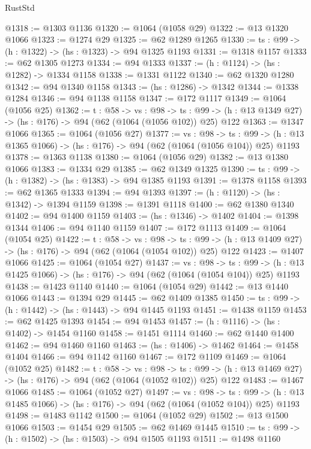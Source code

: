 \begin{lexlean}{RustStd}
\begin{coremodule}
{\begin{coremodule}
{{{{{{{{{{{@1318 := @1303 @1136
@1320 := @1064 (@1058 @29)
@1322 := @13 @1320 @1066
@1323 := @1274 @29
@1325 := @62 @1289 @1265
@1330 := {ts : @99} -> (h : @1322) -> (hs : @1323) -> @94 @1325 @1193
@1331 := @1318 @1157
@1333 := @62 @1305 @1273
@1334 := @94 @1333
@1337 := (h : @1124) -> (hs : @1282) -> @1334 @1158
@1338 := @1331 @1122
@1340 := @62 @1320 @1280
@1342 := @94 @1340 @1158
@1343 := (hs : @1286) -> @1342
@1344 := @1338 @1284
@1346 := @94 @1138 @1158
@1347 := @172 @1117
@1349 := @1064 (@1056 @25)
@1362 := {t : @58} ->
  {vs : @98} ->
  {ts : @99} -> (h : @13 @1349 @27) -> (hs : @176) -> @94 (@62 (@1064 (@1056 @102)) @25) @122
@1363 := @1347 @1066
@1365 := @1064 (@1056 @27)
@1377 := {vs : @98} ->
  {ts : @99} -> (h : @13 @1365 @1066) -> (hs : @176) -> @94 (@62 (@1064 (@1056 @104)) @25) @1193
@1378 := @1363 @1138
@1380 := @1064 (@1056 @29)
@1382 := @13 @1380 @1066
@1383 := @1334 @29
@1385 := @62 @1349 @1325
@1390 := {ts : @99} -> (h : @1382) -> (hs : @1383) -> @94 @1385 @1193
@1391 := @1378 @1158
@1393 := @62 @1365 @1333
@1394 := @94 @1393
@1397 := (h : @1120) -> (hs : @1342) -> @1394 @1159
@1398 := @1391 @1118
@1400 := @62 @1380 @1340
@1402 := @94 @1400 @1159
@1403 := (hs : @1346) -> @1402
@1404 := @1398 @1344
@1406 := @94 @1140 @1159
@1407 := @172 @1113
@1409 := @1064 (@1054 @25)
@1422 := {t : @58} ->
  {vs : @98} ->
  {ts : @99} -> (h : @13 @1409 @27) -> (hs : @176) -> @94 (@62 (@1064 (@1054 @102)) @25) @122
@1423 := @1407 @1066
@1425 := @1064 (@1054 @27)
@1437 := {vs : @98} ->
  {ts : @99} -> (h : @13 @1425 @1066) -> (hs : @176) -> @94 (@62 (@1064 (@1054 @104)) @25) @1193
@1438 := @1423 @1140
@1440 := @1064 (@1054 @29)
@1442 := @13 @1440 @1066
@1443 := @1394 @29
@1445 := @62 @1409 @1385
@1450 := {ts : @99} -> (h : @1442) -> (hs : @1443) -> @94 @1445 @1193
@1451 := @1438 @1159
@1453 := @62 @1425 @1393
@1454 := @94 @1453
@1457 := (h : @1116) -> (hs : @1402) -> @1454 @1160
@1458 := @1451 @1114
@1460 := @62 @1440 @1400
@1462 := @94 @1460 @1160
@1463 := (hs : @1406) -> @1462
@1464 := @1458 @1404
@1466 := @94 @1142 @1160
@1467 := @172 @1109
@1469 := @1064 (@1052 @25)
@1482 := {t : @58} ->
  {vs : @98} ->
  {ts : @99} -> (h : @13 @1469 @27) -> (hs : @176) -> @94 (@62 (@1064 (@1052 @102)) @25) @122
@1483 := @1467 @1066
@1485 := @1064 (@1052 @27)
@1497 := {vs : @98} ->
  {ts : @99} -> (h : @13 @1485 @1066) -> (hs : @176) -> @94 (@62 (@1064 (@1052 @104)) @25) @1193
@1498 := @1483 @1142
@1500 := @1064 (@1052 @29)
@1502 := @13 @1500 @1066
@1503 := @1454 @29
@1505 := @62 @1469 @1445
@1510 := {ts : @99} -> (h : @1502) -> (hs : @1503) -> @94 @1505 @1193
@1511 := @1498 @1160
}}}}}}}}}}}
\end{coremodule}}
\end{coremodule}
\end{lexlean}
